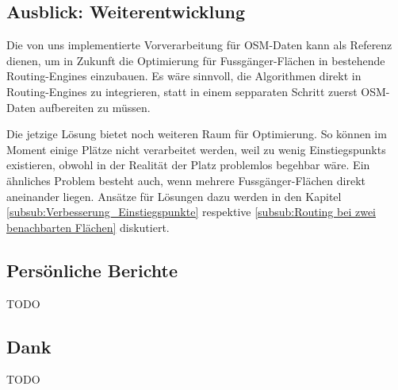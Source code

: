 \subsection{Ausblick: Weiterentwicklung}
\label{sub:Ausblick: Weiterentwicklung}

Die von uns implementierte Vorverarbeitung für \ac{OSM}-Daten kann als Referenz dienen, um in Zukunft die Optimierung für Fussgänger-Flächen in bestehende Routing-Engines einzubauen. Es wäre sinnvoll, die Algorithmen direkt in Routing-Engines zu integrieren, statt in einem sepparaten Schritt zuerst \ac{OSM}-Daten aufbereiten zu müssen.

Die jetzige Lösung bietet noch weiteren Raum für Optimierung. So können im Moment einige Plätze nicht verarbeitet werden, weil zu wenig \glspl{Einstiegspunkt} existieren, obwohl in der Realität der Platz problemlos begehbar wäre. Ein ähnliches Problem besteht auch, wenn mehrere Fussgänger-Flächen direkt aneinander liegen. Ansätze für Lösungen dazu werden in den Kapitel \ref{subsub:Verbesserung_Einstiegspunkte} respektive \ref{subsub:Routing bei zwei benachbarten Flächen} diskutiert.

\subsection{Persönliche Berichte}
\label{sub:Persönliche Berichte}
TODO

\subsection{Dank}
\label{sub:Dank}
TODO
